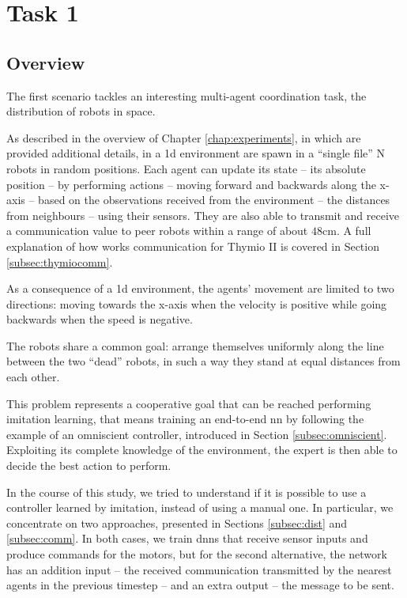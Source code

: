 \section{Task 1}
\label{sec:task1}

\subsection{Overview}
\label{subsec:desc1}

The first scenario tackles an interesting multi-agent coordination task, the 
distribution of robots in space.

As described in the overview of Chapter \ref{chap:experiments}, in which are 
provided additional details, in a \gls{1d} environment are spawn in a ``single 
file'' N robots in random positions. %
Each agent can update its state – its absolute position – by performing actions – 
moving forward and backwards along the x-axis – based on the observations 
received from the environment – the distances from neighbours – using their 
sensors.  They are also able to transmit and receive a communication value to 
peer robots within a range of about $48$\gls{cm}. 
A full explanation of how works communication for Thymio II is covered in 
Section \ref{subsec:thymiocomm}.

As a consequence of a \gls{1d} environment, the agents' movement are 
limited to two directions: moving towards the x-axis when the velocity is positive 
while going backwards when the speed is negative. 

The robots share a common goal: arrange themselves uniformly along the 
line between the two ``dead'' robots, in such a way they stand at equal distances 
from each other.


This problem represents a cooperative goal that can be reached performing 
imitation learning, that means training an end-to-end \gls{nn} by following 
the example of an omniscient controller, introduced in Section 
\ref{subsec:omniscient}.
Exploiting its complete knowledge of the environment, %
the expert is then able to decide the best action to perform.

In the course of this study, we tried to understand if it is possible to use a 
controller learned by imitation, instead of using a manual one. In particular, we 
concentrate on two approaches, presented in Sections \ref{subsec:dist} and 
\ref{subsec:comm}.
In both cases, we train \glspl{dnn} that receive sensor inputs and produce 
commands for the motors, but for the second alternative, the network has an 
addition input – the received communication transmitted by the nearest agents in 
the previous timestep – and an extra output – the message to be sent.

